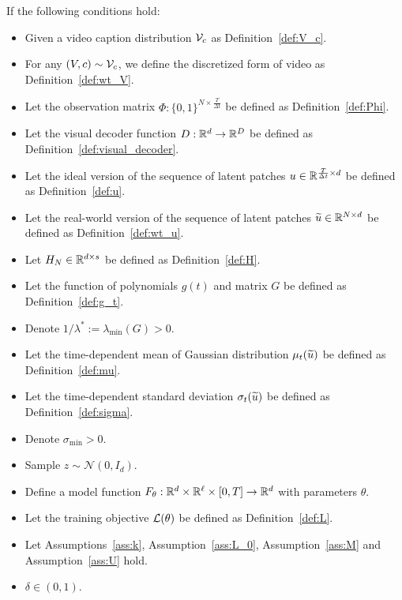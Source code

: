 \begin{theorem}\label{thm:inter_extra_polation}
    If the following conditions hold:
    \begin{itemize}
        \item Given a video caption distribution ${\cal V}_c$ as Definition~\ref{def:V_c}.
        \item For any $(V, c) \sim {\cal V}_c$, we define the discretized form of video as Definition~\ref{def:wt_V}.
        \item Let the observation matrix $\Phi: \{0, 1\}^{N \times \frac{T}{\Delta t}}$ be defined as Definition~\ref{def:Phi}.
        \item Let the visual decoder function $D: \mathbb{R}^d \rightarrow \mathbb{R}^D$ be defined as Definition~\ref{def:visual_decoder}.
        \item Let the ideal version of the sequence of latent patches $u \in \mathbb{R}^{\frac{T}{\Delta t} \times d}$ be defined as Definition~\ref{def:u}.
        \item Let the real-world version of the sequence of latent patches $\widetilde{u} \in \mathbb{R}^{N \times d}$ be defined as Definition~\ref{def:wt_u}.
        \item Let $H_N \in \mathbb{R}^{d \times s}$ be defined as Definition~\ref{def:H}.
        \item Let the function of polynomials $g(t)$ and matrix $G$ be defined as Definition~\ref{def:g_t}.
        \item Denote $1/\lambda^* := \lambda_{\min}(G) > 0$.
        \item Let the time-dependent mean of Gaussian distribution $\mu_t(\widetilde{u})$ be defined as Definition~\ref{def:mu}.
        \item Let the time-dependent standard deviation $\sigma_t(\widetilde{u})$ be defined as Definition~\ref{def:sigma}.
        \item Denote $\sigma_{\min} > 0$.
        \item Sample $z \sim \mathcal{N}(0, I_d)$.
        \item Define a model function $F_\theta: \mathbb{R}^d \times \mathbb{R}^\ell \times [0, T] \rightarrow \mathbb{R}^d$ with parameters $\theta$.
        \item Let the training objective ${\cal L}(\theta)$ be defined as Definition~\ref{def:L}.
        \item Let Assumptions~\ref{ass:k}, Assumption~\ref{ass:L_0}, Assumption~\ref{ass:M} and Assumption~\ref{ass:U} hold.
        \item $\delta \in (0, 1)$.
    \end{itemize}

\end{theorem}
